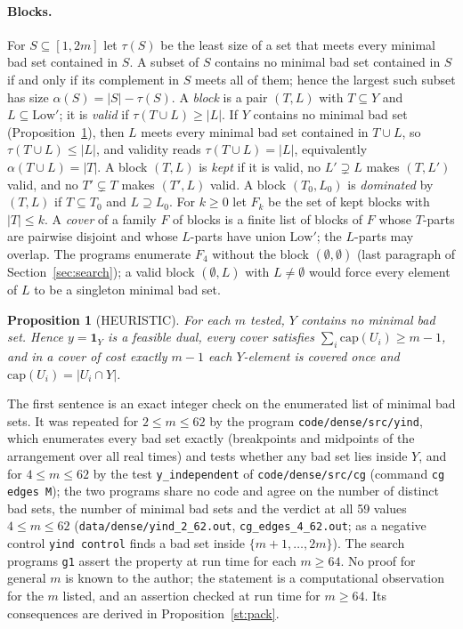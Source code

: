 \documentclass[11pt]{article}
\newtheorem{proposition}[theorem]{Proposition}
\theoremstyle{remark}
\begin{document}
\paragraph{Blocks.} For $S\subseteq[1,2m]$ let $\tau(S)$ be the least size of a set that meets every minimal bad set contained in $S$. A subset of $S$ contains no minimal bad set contained in $S$ if and only if its complement in $S$ meets all of them; hence the largest such subset has size $\alpha(S)=|S|-\tau(S)$. A \emph{block} is a pair $(T,L)$ with $T\subseteq Y$ and $L\subseteq\mathrm{Low}'$; it is \emph{valid} if $\tau(T\cup L)\ge|L|$. If $Y$ contains no minimal bad set (Proposition~\ref{st:Y}), then $L$ meets every minimal bad set contained in $T\cup L$, so $\tau(T\cup L)\le|L|$, and validity reads $\tau(T\cup L)=|L|$, equivalently $\alpha(T\cup L)=|T|$. A block $(T,L)$ is \emph{kept} if it is valid, no $L'\supsetneq L$ makes $(T,L')$ valid, and no $T'\subsetneq T$ makes $(T',L)$ valid. A block $(T_0,L_0)$ is \emph{dominated} by $(T,L)$ if $T\subseteq T_0$ and $L\supseteq L_0$. For $k\ge0$ let $F_k$ be the set of kept blocks with $|T|\le k$. A \emph{cover} of a family $F$ of blocks is a finite list of blocks of $F$ whose $T$-parts are pairwise disjoint and whose $L$-parts have union $\mathrm{Low}'$; the $L$-parts may overlap. The programs enumerate $F_4$ without the block $(\emptyset,\emptyset)$ (last paragraph of Section~\ref{sec:search}); a valid block $(\emptyset,L)$ with $L\ne\emptyset$ would force every element of $L$ to be a singleton minimal bad set.

\begin{proposition}[HEURISTIC]\label{st:Y}
For each $m$ tested, $Y$ contains no minimal bad set. Hence $y=\mathbf 1_Y$ is a feasible dual, every cover satisfies $\sum_i\mathrm{cap}(U_i)\ge m-1$, and in a cover of cost exactly $m-1$ each $Y$-element is covered once and $\mathrm{cap}(U_i)=|U_i\cap Y|$.
\end{proposition}
\noindent The first sentence is an exact integer check on the enumerated list of minimal bad sets. It was repeated for $2\le m\le62$ by the program \texttt{code/dense/src/yind}, which enumerates every bad set exactly (breakpoints and midpoints of the arrangement over all real times) and tests whether any bad set lies inside $Y$, and for $4\le m\le62$ by the test \texttt{y\_independent} of \texttt{code/dense/src/cg} (command \texttt{cg edges M}); the two programs share no code and agree on the number of distinct bad sets, the number of minimal bad sets and the verdict at all 59 values $4\le m\le62$ (\texttt{data/dense/yind\_2\_62.out}, \texttt{cg\_edges\_4\_62.out}; as a negative control \texttt{yind control} finds a bad set inside $\{m+1,\dots,2m\}$). The search programs \texttt{g1} assert the property at run time for each $m\ge64$. No proof for general $m$ is known to the author; the statement is a computational observation for the $m$ listed, and an assertion checked at run time for $m\ge64$. Its consequences are derived in Proposition~\ref{st:pack}.
\end{document}
